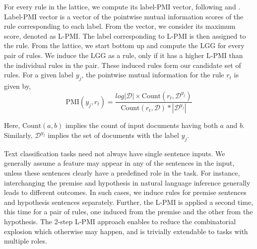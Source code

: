 
For every rule in the lattice, we compute its label-PMI vector, following \citet{singhal-etal-2023-intendd} and  \citet{Jin_Wanvarie_Le_2022}. Label-PMI vector is a vector of the pointwise mutual information scores of the rule corresponding to each label. From the vector, we consider its maximum score, denoted as {\sc L-PMI}. The label corresponding to {\sc L-PMI} is then assigned to the rule.  %
From the lattice, we start bottom up and compute the LGG for every pair of rules. We induce the LGG as a rule, only if it has a higher {\sc L-PMI} than the individual rules in the pair. These induced rules form our candidate set of rules. For a given label $y_j$, the pointwise mutual information for the rule $r_t$ is given by,
$$\text{PMI}(y_j,r_t) = \frac{log |\mathcal{D}| \times \text{Count}(r_t,\mathcal{D}^{y_j})}{\text{Count}(r_t,\mathcal{D})*|\mathcal{D}^{y_j}|}$$

Here, $\text{Count}(a,b)$ implies the count of input documents having both $a$ and $b$. Similarly, $\mathcal{D}^{y_j}$ implies the set of  documents with the label $y_j$.   


Text classification tasks need not always have single sentence inputs. We generally assume a feature may appear in any of the sentences in the input, unless these sentences clearly have a predefined role in the task. For instance, interchanging the premise and hypothesis in natural language inference \cite{berant-etal-2011-global,DAGAN_DOLAN_MAGNINI_ROTH_2010} generally leads to different outcomes. In such cases, we induce rules for premise sentences and hypothesis sentences separately. Further, the {\sc L-PMI} is applied a second time, this time for a pair of rules, one induced from the premise and the other from the hypothesis. The 2-step  {\sc L-PMI} approach enables to reduce the combinatorial explosion which otherwise may happen, and is trivially extendable to tasks with multiple roles.  

